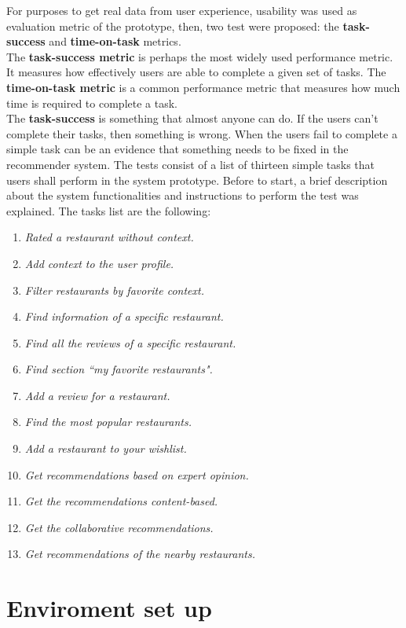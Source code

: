 For purposes to get real data from user experience, usability was used
as evaluation metric of the prototype, then, two test were proposed: the
\textbf{task-success} and \textbf{time-on-task} metrics. \\ 
The \textbf{task-success metric} is perhaps the most widely used
performance metric. It measures how effectively users are able to
complete a given set of tasks.  The \textbf{time-on-task metric} is a
common performance metric that measures how much time is required to
complete a task\cite{albert2013measuring}.\\
The \textbf{task-success} is something that almost anyone can do. 
If the users can't complete their tasks, then something is wrong. 
When the users fail to complete a simple task can be an evidence 
that something needs to be fixed in the recommender system.  
The tests consist of a list of thirteen simple tasks that users shall
perform in the system prototype. Before to start, a brief description
about the system functionalities and instructions to perform the test
was explained. The tasks list are the following:
\begin{enumerate} 
\item \textit{Rated a restaurant without context.}
\item \textit{Add context to the user profile.}
\item \textit{Filter restaurants by favorite context.}
\item \textit{Find information of a specific restaurant.}
\item \textit{Find all the reviews of a specific restaurant.} 
\item \textit{Find section ``my favorite restaurants".}
\item \textit{Add a review for a restaurant.}
\item \textit{Find the most popular restaurants.}
\item \textit{Add a restaurant to your wishlist.}
\item \textit{Get recommendations based on expert opinion.} 
\item \textit{Get the recommendations content-based.}
\item \textit{Get the collaborative recommendations.}
\item \textit{Get recommendations of the nearby restaurants.}
\end{enumerate} 

\section{Enviroment set up}

